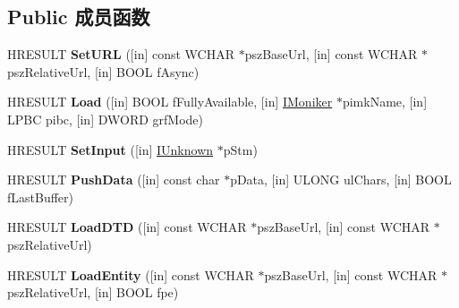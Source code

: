 \subsection*{Public 成员函数}
\begin{DoxyCompactItemize}
\item 
\mbox{\label{interface_x_m_l_p_s_r_1_1_i_x_m_l_parser_ab6ccde9b295943b4f827ce4ff0cd37c2}} 
H\+R\+E\+S\+U\+LT {\bfseries Set\+U\+RL} (\mbox{[}in\mbox{]} const W\+C\+H\+AR $\ast$psz\+Base\+Url, \mbox{[}in\mbox{]} const W\+C\+H\+AR $\ast$psz\+Relative\+Url, \mbox{[}in\mbox{]} B\+O\+OL f\+Async)
\item 
\mbox{\label{interface_x_m_l_p_s_r_1_1_i_x_m_l_parser_ae1fe7e926799dbba8ea9632db2d7ff06}} 
H\+R\+E\+S\+U\+LT {\bfseries Load} (\mbox{[}in\mbox{]} B\+O\+OL f\+Fully\+Available, \mbox{[}in\mbox{]} \hyperlink{interface_i_moniker}{I\+Moniker} $\ast$pimk\+Name, \mbox{[}in\mbox{]} L\+P\+BC pibc, \mbox{[}in\mbox{]} D\+W\+O\+RD grf\+Mode)
\item 
\mbox{\label{interface_x_m_l_p_s_r_1_1_i_x_m_l_parser_a569becf1ffd7752fdc0285317bf024e3}} 
H\+R\+E\+S\+U\+LT {\bfseries Set\+Input} (\mbox{[}in\mbox{]} \hyperlink{interface_i_unknown}{I\+Unknown} $\ast$p\+Stm)
\item 
\mbox{\label{interface_x_m_l_p_s_r_1_1_i_x_m_l_parser_a974915d87c9913c4e7b3401c7ad7f44a}} 
H\+R\+E\+S\+U\+LT {\bfseries Push\+Data} (\mbox{[}in\mbox{]} const char $\ast$p\+Data, \mbox{[}in\mbox{]} U\+L\+O\+NG ul\+Chars, \mbox{[}in\mbox{]} B\+O\+OL f\+Last\+Buffer)
\item 
\mbox{\label{interface_x_m_l_p_s_r_1_1_i_x_m_l_parser_a0ecd27f2bf8b38ca1d70b7ea2645049c}} 
H\+R\+E\+S\+U\+LT {\bfseries Load\+D\+TD} (\mbox{[}in\mbox{]} const W\+C\+H\+AR $\ast$psz\+Base\+Url, \mbox{[}in\mbox{]} const W\+C\+H\+AR $\ast$psz\+Relative\+Url)
\item 
\mbox{\label{interface_x_m_l_p_s_r_1_1_i_x_m_l_parser_a8018253d161cf16c1c84d1bfbb413d44}} 
H\+R\+E\+S\+U\+LT {\bfseries Load\+Entity} (\mbox{[}in\mbox{]} const W\+C\+H\+AR $\ast$psz\+Base\+Url, \mbox{[}in\mbox{]} const W\+C\+H\+AR $\ast$psz\+Relative\+Url, \mbox{[}in\mbox{]} B\+O\+OL fpe)

\end{DoxyCompactItemize}
